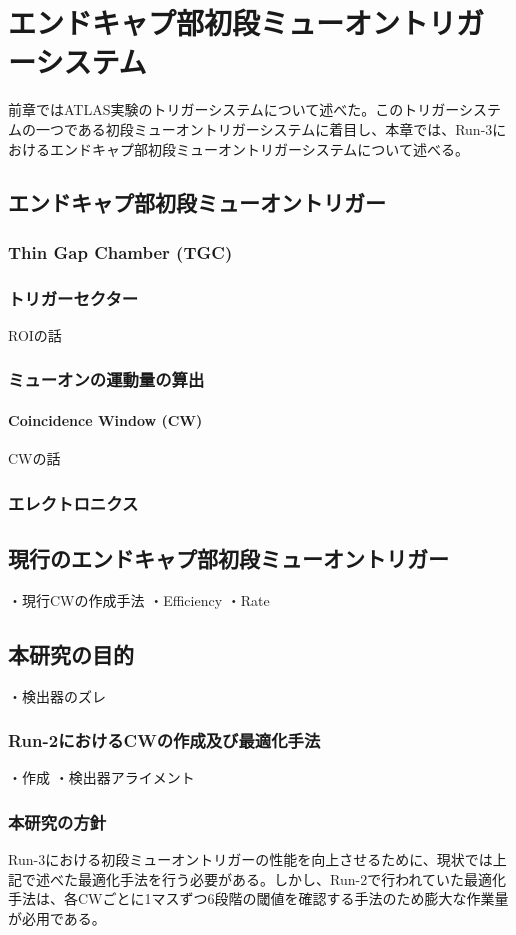 \chapter{エンドキャプ部初段ミューオントリガーシステム}
前章ではATLAS実験のトリガーシステムについて述べた。このトリガーシステムの一つである初段ミューオントリガーシステムに着目し、本章では、Run-3におけるエンドキャプ部初段ミューオントリガーシステムについて述べる。

\section{エンドキャプ部初段ミューオントリガー}
\subsection{Thin Gap Chamber (TGC)}

\subsection{トリガーセクター}
ROIの話
\subsection{ミューオンの運動量の算出}

\subsubsection{Coincidence Window (CW)}
CWの話

\subsection{エレクトロニクス}



\section{現行のエンドキャプ部初段ミューオントリガー}
・現行CWの作成手法
・Efficiency
・Rate

\section{本研究の目的}
・検出器のズレ
\subsection{Run-2におけるCWの作成及び最適化手法}
・作成
・検出器アライメント
\subsection{本研究の方針}
Run-3における初段ミューオントリガーの性能を向上させるために、現状では上記で述べた最適化手法を行う必要がある。しかし、Run-2で行われていた最適化手法は、各CWごとに1マスずつ6段階の閾値を確認する手法のため膨大な作業量が必用である。



